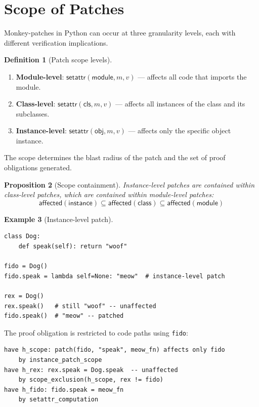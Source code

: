 \documentclass[11pt,a4paper]{report}
\theoremstyle{definition}
\newtheorem{definition}{Definition}[chapter]
\newtheorem{example}[definition]{Example}
\theoremstyle{plain}
\newtheorem{proposition}[definition]{Proposition}
\begin{document}
\section{Scope of Patches}
\label{sec:patch-scope}

Monkey-patches in Python can occur at three granularity levels, each with
different verification implications.

\begin{definition}[Patch scope levels]
\begin{enumerate}
  \item \textbf{Module-level}: $\mathsf{setattr}(\mathsf{module}, m, v)$ ---
    affects all code that imports the module.
  \item \textbf{Class-level}: $\mathsf{setattr}(\mathsf{cls}, m, v)$ ---
    affects all instances of the class and its subclasses.
  \item \textbf{Instance-level}: $\mathsf{setattr}(\mathsf{obj}, m, v)$ ---
    affects only the specific object instance.
\end{enumerate}
The scope determines the blast radius of the patch and the set of proof
obligations generated.
\end{definition}

\begin{proposition}[Scope containment]
\label{prop:scope-contain}
Instance-level patches are contained within class-level patches, which are
contained within module-level patches:
\[
  \mathsf{affected}(\mathsf{instance}) \subseteq
  \mathsf{affected}(\mathsf{class}) \subseteq
  \mathsf{affected}(\mathsf{module})
\]
\end{proposition}

\begin{example}[Instance-level patch]
\begin{lstlisting}[style=python]
class Dog:
    def speak(self): return "woof"

fido = Dog()
fido.speak = lambda self=None: "meow"  # instance-level patch

rex = Dog()
rex.speak()   # still "woof" -- unaffected
fido.speak()  # "meow" -- patched
\end{lstlisting}
The proof obligation is restricted to code paths using \texttt{fido}:
\begin{lstlisting}[style=proof]
have h_scope: patch(fido, "speak", meow_fn) affects only fido
    by instance_patch_scope
have h_rex: rex.speak = Dog.speak  -- unaffected
    by scope_exclusion(h_scope, rex != fido)
have h_fido: fido.speak = meow_fn
    by setattr_computation
\end{lstlisting}
\end{example}
\end{document}
